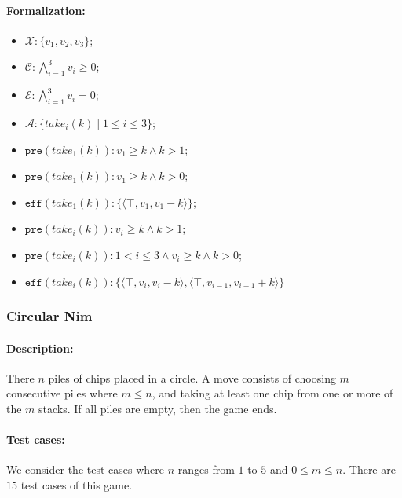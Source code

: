 \documentclass[review]{elsarticle}
\newcommand{\set}[1]{\{ #1 \}}
\newcommand{\tuple}[1]{\langle {#1} \rangle}
\newcommand{\true}{\top}
\newcommand{\statevar}{\mathcal{X}}
\newcommand{\act}{\mathcal{A}}
\newcommand{\constraint}{\mathcal{C}}
\newcommand{\estate}{\mathcal{E}}
\newcommand{\pre}{\mathtt{pre}}
\newcommand{\eff}{\mathtt{eff}}
\begin{document}
\paragraph{Formalization:}
\begin{itemize}
	\item $\statevar: \set{v_1, v_2, v_3}$;
	\item $\constraint:\bigwedge_{i=1}^{3} v_i \ge 0$;
	\item $\estate: \bigwedge_{i=1}^{3} v_i = 0$;
	\item $\act:\set{take_i(k){\mid}1 \le i \le 3} $;
	\item $\pre(take_1(k)) : v_1 \ge k \wedge k > 1$;
	\item {\color{red}$\pre(take_1(k)) : v_1 \ge k \wedge k > 0$;}
	\item $\eff(take_1(k)) : \set{\tuple{\true,v_1,v_1 -k}}$;
	\item $\pre(take_i(k)) : v_i \ge k \wedge k > 1$;
	\item {\color{red}$\pre(take_i(k)) : 1 < i \le 3 \wedge v_i \ge k \wedge k > 0$;}
	\item $\eff(take_i(k)) : \set{\tuple{\true,v_i,v_i -k}, \tuple{\true,v_{i-1},v_{i-1} + k}}$
\end{itemize}

\subsubsection{Circular Nim \protect\cite{DufH2013}}

\paragraph{Description:}  
There $n$ piles of chips placed in a circle. 
A move consists of choosing $m$ consecutive piles where $m \leq n$, and taking at least one chip from one or more of the $m$ stacks. 
If all piles are empty, then the game ends. 
%		

\paragraph{Test cases:}
We consider the test cases where $n$ ranges from $1$ to $5$ and $0 \le m \leq n$.
There are $15$ test cases of this game.
\end{document}
